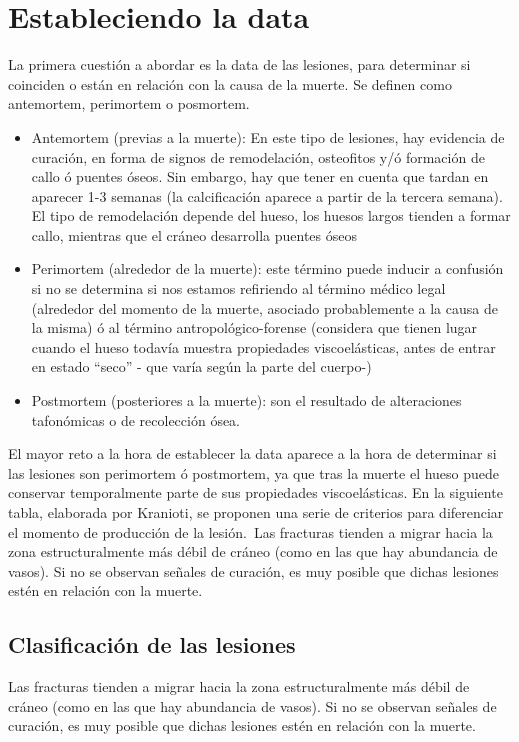 \section{Estableciendo la data}
La primera cuestión a abordar es la data de las lesiones, para determinar si coinciden o están en relación con la causa de la muerte. Se definen como antemortem, perimortem o posmortem.\
\begin{itemize}
	\item Antemortem (previas a la muerte): En este tipo de lesiones, hay evidencia de curación, en forma de signos de remodelación, osteofitos y/ó formación de callo ó puentes óseos. Sin embargo, hay que tener en cuenta que tardan en aparecer 1-3 semanas (la calcificación aparece a partir de la tercera semana).  El tipo de remodelación depende del hueso, los huesos largos tienden a formar callo, mientras que el cráneo desarrolla puentes óseos \cite{Kranioti2015}
	\item Perimortem (alrededor de la muerte): este término puede inducir a confusión si no se determina si nos estamos refiriendo al término médico legal (alrededor del momento de la muerte, asociado probablemente a la causa de la misma) ó al término antropológico-forense (considera que tienen lugar cuando el hueso todavía muestra propiedades viscoelásticas, antes de entrar en estado “seco” - que varía según la parte del cuerpo-) \cite{Kranioti2015}
	\item Postmortem (posteriores a la muerte): son el resultado de alteraciones tafonómicas o de recolección ósea. 
\end{itemize}
El mayor reto a la hora de establecer la data aparece a la hora de determinar si las lesiones son perimortem ó postmortem, ya que tras la muerte el hueso puede conservar temporalmente parte de sus propiedades viscoelásticas. En la siguiente tabla, elaborada por Kranioti\cite{Kranioti2015}, se proponen una serie de criterios para diferenciar el momento de producción de la lesión.\
Las fracturas tienden a migrar hacia la zona estructuralmente más débil de cráneo (como en las que hay abundancia de vasos). Si no se observan señales de curación, es muy posible que dichas lesiones estén en relación con la muerte. 
\subsection{Clasificación de las lesiones}
Las fracturas tienden a migrar hacia la zona estructuralmente más débil de cráneo (como en las que hay abundancia de vasos). Si no se observan señales de curación, es muy posible que dichas lesiones estén en relación con la muerte.

